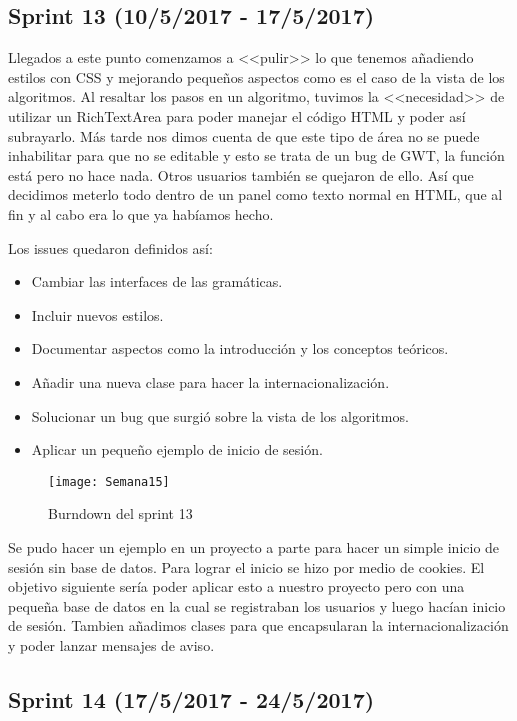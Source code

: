 \subsection{Sprint 13 (10/5/2017 - 17/5/2017)}

Llegados a este punto comenzamos a <<pulir>> lo que tenemos añadiendo estilos con CSS y mejorando pequeños aspectos como es el caso de la vista de los algoritmos. Al resaltar los pasos en un algoritmo, tuvimos la <<necesidad>> de utilizar un RichTextArea para poder manejar el código HTML y poder así subrayarlo. Más tarde nos dimos cuenta de que este tipo de área no se puede inhabilitar para que no se editable y esto se trata de un bug de GWT, la función está pero no hace nada. Otros usuarios también se quejaron de ello. Así que decidimos meterlo todo dentro de un panel como texto normal en HTML, que al fin y al cabo era lo que ya habíamos hecho.

Los issues quedaron definidos así:
\begin{itemize}
\item Cambiar las interfaces de las gramáticas.
\item Incluir nuevos estilos.
\item Documentar aspectos como la introducción y los conceptos teóricos.
\item Añadir una nueva clase para hacer la internacionalización.
\item Solucionar un bug que surgió sobre la vista de los algoritmos.
\item Aplicar un pequeño ejemplo de inicio de sesión.
\end{itemize}

\begin{figure}[h]
\centering
\texttt{[image: Semana15]}
\caption{Burndown del sprint 13}
\label{fig:A.12}
\end{figure}

Se pudo hacer un ejemplo en un proyecto a parte para hacer un simple inicio de sesión sin base de datos. Para lograr el inicio se hizo por medio de cookies. El objetivo siguiente sería poder aplicar esto a nuestro proyecto pero con una pequeña base de datos en la cual se registraban los usuarios y luego hacían inicio de sesión. Tambien añadimos clases para que encapsularan la internacionalización y poder lanzar mensajes de aviso.

\subsection{Sprint 14 (17/5/2017 - 24/5/2017)}

